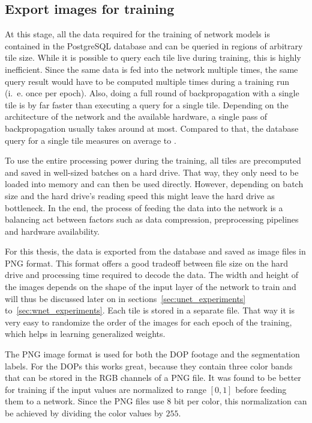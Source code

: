 \subsection{Export images for training}
\label{sec:image_export}
At this stage, all the data required for the training of network models is contained in the PostgreSQL database and can be queried in regions of arbitrary tile size. While it is possible to query each tile live during training, this is highly inefficient. Since the same data is fed into the network multiple times, the same query result would have to be computed multiple times during a training run (i.~e. once per epoch). Also, doing a full round of backpropagation with a single tile is by far faster than executing a query for a single tile. Depending on the architecture of the network and the available hardware, a single pass of backpropagation usually takes around  at most. Compared to that, the database query for a single tile measures on average to .

To use the entire processing power during the training, all tiles are precomputed and saved in well-sized batches on a hard drive. That way, they only need to be loaded into memory and can then be used directly. However, depending on batch size and the hard drive's reading speed this might leave the hard drive as bottleneck. In the end, the process of feeding the data into the network is a balancing act between factors such as data compression, preprocessing pipelines and hardware availability.

For this thesis, the data is exported from the database and saved as image files in PNG format. This format offers a good tradeoff between file size on the hard drive and processing time required to decode the data. The width and height of the images depends on the shape of the input layer of the network to train and will thus be discussed later on in sections~\ref{sec:unet_experiments} to~\ref{sec:wnet_experiments}. Each tile is stored in a separate file. That way it is very easy to randomize the order of the images for each epoch of the training, which helps in learning generalized weights.

The PNG image format is used for both the DOP footage and the segmentation labels. For the DOPs this works great, because they contain three color bands that can be stored in the RGB channels of a PNG file. It was found to be better for training if the input values are normalized to range $[0, 1]$ before feeding them to a network. Since the PNG files use 8 bit per color, this normalization can be achieved by dividing the color values by $255$.

